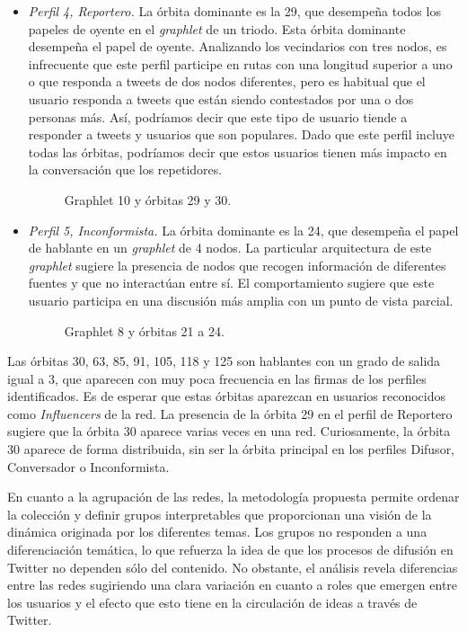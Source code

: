 \begin{itemize}
\item \emph{Perfil 4, Reportero.} La órbita dominante es la 29, que desempeña todos los papeles de oyente en el \textit{graphlet} de un triodo. Esta órbita dominante desempeña el papel de oyente. Analizando los vecindarios con tres nodos, es infrecuente que este perfil participe en rutas con una longitud superior a uno o que responda a tweets de dos nodos diferentes, pero es habitual que el usuario responda a tweets que están siendo contestados por una o dos personas más. Así, podríamos decir que este tipo de usuario tiende a responder a tweets y usuarios que son populares. Dado que este perfil incluye todas las órbitas, podríamos decir que estos usuarios tienen más impacto en la conversación que los repetidores. \begin{figure}[htbp]
   \centering
   
    \caption{Graphlet 10 y órbitas 29 y 30.}
    \label{img:web-comp}
\end{figure}

\item \emph{Perfil 5, Inconformista.} La órbita dominante es la 24, que desempeña el papel de hablante en un \textit{graphlet} de 4 nodos. La particular arquitectura de este \textit{graphlet} sugiere la presencia de nodos que recogen información de diferentes fuentes y que no interactúan entre sí. El comportamiento sugiere que este usuario participa en una discusión más amplia con un punto de vista parcial. \begin{figure}[htbp]
   \centering
   
    \caption{Graphlet 8 y órbitas 21 a 24.}
    \label{img:web-comp}
\end{figure}

\end{itemize}

Las órbitas 30, 63, 85, 91, 105, 118 y 125 son hablantes con un grado de salida igual a 3, que aparecen con muy poca frecuencia en las firmas de los perfiles identificados. Es de esperar que estas órbitas aparezcan en usuarios reconocidos como \textit{Influencers} de la red. La presencia de la órbita 29 en el perfil de Reportero sugiere que la órbita 30 aparece varias veces en una red. Curiosamente, la órbita 30 aparece de forma distribuida, sin ser la órbita principal en los perfiles Difusor, Conversador o Inconformista.

En cuanto a la agrupación de las redes, la metodología propuesta permite ordenar la colección y definir grupos interpretables que proporcionan una visión de la dinámica originada por los diferentes temas. Los grupos no responden a una diferenciación temática, lo que refuerza la idea de que los procesos de difusión en Twitter no dependen sólo del contenido. No obstante, el análisis revela diferencias entre las redes sugiriendo una clara variación en cuanto a roles que emergen entre los usuarios y el efecto que esto tiene en la circulación de ideas a través de Twitter. 

